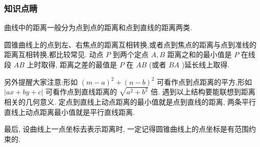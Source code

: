 \subsubsection*{知识点睛}

曲线中的距离一般分为点到点的距离和点到直线的距离两类.

圆锥曲线上的点到左、右焦点的距离互相转换,或者点到焦点的距离与点到准线的距离互相转换,都比较常见. 动点 $P$ 到两个定点 $A,B$ 距离之和的最小值是 $P$ 在线段 ${AB}$ 上时取得, 距离之差的最值是 $P$ 在 ${AB}$ (或者 ${BA}$ )延长线上取得.

另外提醒大家注意:形如 ${\left( m - a\right) }^{2} + {\left( n - b\right) }^{2}$ 可看作点到点距离的平方,形如 $\left| {{ax} + {by} + c}\right|$ 可看作点到直线距离的 $\sqrt{{a}^{2} + {b}^{2}}$ 倍. 遇到以上结构要能联想到距离相关的几何意义. 定点到直线上动点距离的最小值就是点到直线的距离, 两条平行直线上动点距离最小值就是平行直线距离.

最后, 设曲线上一点坐标去表示距离时, 一定记得圆锥曲线上的点坐标是有范围约束的.

